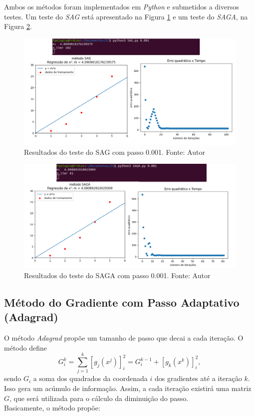 \documentclass[a4paper,12pt]{article}
\begin{document}
Ambos os métodos foram implementados em \textit{Python} e submetidos a diversos testes. Um teste do \textit{SAG} está apresentado na Figura \ref{fig:SAG} e um teste do \textit{SAGA}, na Figura \ref{fig:SAGA}.
\begin{figure}[H]
\centering 
\includegraphics[scale=0.5]{Figuras/SAG.png}
\caption{Resultados do teste do SAG com passo 0.001. Fonte: Autor}
\label{fig:SAG}
\end{figure} 

\begin{figure}[H]
\centering 
\includegraphics[scale=0.5]{Figuras/SAGA.png}
\caption{Resultados do teste do SAGA com passo 0.001. Fonte: Autor}
\label{fig:SAGA}
\end{figure} 



\subsection{Método do Gradiente com Passo Adaptativo (Adagrad)}

O método \textit{Adagrad} \cite{adagradpaper} propõe um tamanho de passo que decai a cada iteração.
O método define $$G_i^k=\sum_{j=1}^k [g_j(x^j)]_i^2=G_{i}^{k-1}+[g_k(x^k)]_i^2,$$ sendo $G_i$ a soma dos quadrados da coordenada $i$ dos gradientes até a iteração $k$. Isso gera um acúmulo de informação. Assim, a cada iteração existirá uma matriz $G$, que será utilizada para o cálculo da diminuição do passo.\\
Basicamente, o método propõe:
\end{document}

